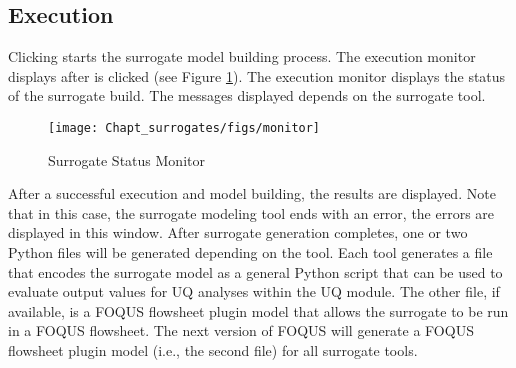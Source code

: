\subsection{Execution}

Clicking  starts the surrogate model building process.  The
execution monitor displays after  is clicked (see Figure
\ref{fig.surrogate.monitor}). The execution monitor displays the status of the surrogate build. The messages displayed depends on the surrogate tool.

\begin{figure}[H]
	\begin{center}
		\texttt{[image: Chapt\_surrogates/figs/monitor]}
		\caption{Surrogate Status Monitor}
		\label{fig.surrogate.monitor}
	\end{center}
\end{figure}

After a successful execution and model building, the results are displayed. Note that in this case, the surrogate modeling tool ends with an error, the errors are displayed in this window. After surrogate generation completes, one or two Python files will be generated depending on the tool. Each tool generates a file that encodes the surrogate model as a general Python script that can be used to evaluate output values for UQ analyses within the UQ module. The other file, if available, is a FOQUS flowsheet plugin model that allows the surrogate to be run in a FOQUS flowsheet. The next version of FOQUS will generate a FOQUS flowsheet plugin model (i.e., the second file) for all surrogate tools.


